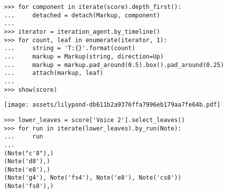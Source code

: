 \begin{abjadbookoutput}
\begin{singlespacing}
\vspace{-0.5\baselineskip}
\begin{lstlisting}
>>> for component in iterate(score).depth_first():
...     detached = detach(Markup, component)
...
>>> iterator = iteration_agent.by_timeline()
>>> for count, leaf in enumerate(iterator, 1):
...     string = 'T:{}'.format(count)
...     markup = Markup(string, direction=Up)
...     markup = markup.pad_around(0.5).box().pad_around(0.25)
...     attach(markup, leaf)
...
>>> show(score)
\end{lstlisting}
\noindent\texttt{[image: assets/lilypond-db611b2a9376ffa7996eb179aa7fe64b.pdf]}
\end{singlespacing}
\end{abjadbookoutput}

\begin{comment}
<abjad>
lower_leaves = score['Voice 2'].select_leaves()
for run in iterate(lower_leaves).by_run(Note):
    run

</abjad>
\end{comment}

\begin{abjadbookoutput}
\begin{singlespacing}
\vspace{-0.5\baselineskip}
\begin{lstlisting}
>>> lower_leaves = score['Voice 2'].select_leaves()
>>> for run in iterate(lower_leaves).by_run(Note):
...     run
...
(Note("c'8"),)
(Note('d8'),)
(Note('e8'),)
(Note('g4'), Note('fs4'), Note('e8'), Note('cs8'))
(Note('fs8'),)
\end{lstlisting}
\end{singlespacing}
\end{abjadbookoutput}

\begin{comment}
<abjad>
for component in iterate(score).depth_first():
    detached = detach(Markup, component)

upper_leaves = score['Voice 1'].select_leaves()
for logical_tie in iterate(upper_leaves).by_logical_tie(pitched=True):
    markup = Markup('H', direction=Up)
    markup = markup.pad_around(0.5).box()
    attach(markup, logical_tie.head)

show(score)
</abjad>
\end{comment}

